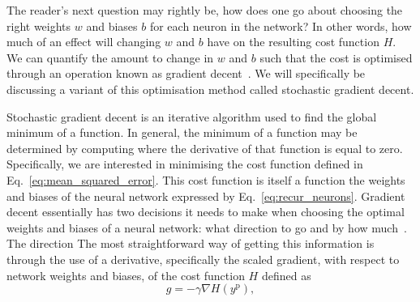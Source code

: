 The reader's next question may 
rightly be, how does one go about choosing the right weights $w$ and biases $b$ for 
each neuron in the network? In other words, how much of an effect will 
changing $w$ and $b$ have on the resulting cost function $H$. We can quantify the amount to 
change in $w$ and $b$ such that the cost is optimised through an operation 
known as gradient 
decent~\cite{1609.04747}. We will specifically be discussing a 
variant of this optimisation method called stochastic gradient decent.

%
%
Stochastic gradient decent is an iterative algorithm used to find the global 
minimum of a function. In general, the minimum of a function may 
be determined by computing where the derivative of that function is equal to 
zero. Specifically, we are interested in minimising the cost function 
defined in Eq.~\ref{eq:mean_squared_error}. This cost function is itself 
a function the weights and biases of the neural network expressed by
Eq.~\ref{eq:recur_neurons}. 
Gradient decent essentially has two 
decisions it needs to make when 
choosing the optimal weights and biases of a neural network: what direction to go and by how 
much~. The direction The most straightforward way of getting this 
information is through the use of a derivative, specifically the scaled gradient, with respect to network 
weights and biases,
of the cost function $H$ defined as 
%
\begin{equation}
    g = - \gamma \nabla H(y^{\mathrm{p}}),
\end{equation}{}
%
 
